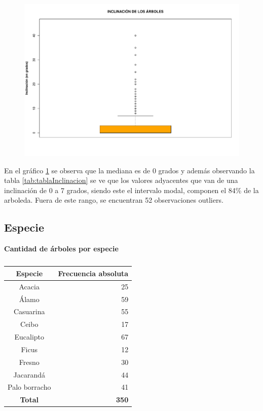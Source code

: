 \documentclass[11pt]{article}
\begin{document}
\begin{figure}[h!]
  \begin{center}
    \includegraphics[width=0.9\linewidth]{boxInclinacion.pdf}
    \caption{}
    \label{fig:boxInclinacion}
  \end{center}  
\end{figure}

\begin{justify}
  En el gráfico \ref{fig:boxInclinacion} se observa que la mediana
  es de 0 grados y además observando la tabla \ref{tab:tablaInclinacion}
  se ve que los valores adyacentes que van de una inclinación de 0 a 7 grados,
  siendo este el intervalo modal, componen el 84\% de la arboleda.
  Fuera de este rango, se encuentran 52 observaciones outliers. 
\end{justify}


\subsection{Especie}

\begin{table}[h!]
  \begin{center}
    \caption*{\textbf{Cantidad de árboles por especie}}
    \begin{tabular}{| c | r |}
      \hline
      \textbf{Especie} & \textbf{Frecuencia absoluta} \\ \hline
      Acacia & 25 \\ \hline
      Álamo & 59 \\ \hline
      Casuarina & 55 \\ \hline
      Ceibo & 17 \\ \hline
      Eucalipto & 67 \\ \hline
      Ficus & 12 \\ \hline
      Fresno & 30 \\ \hline
      Jacarandá & 44 \\ \hline
      Palo borracho & 41 \\ \hline
      \textbf{Total} & \textbf{350} \\ \hline
    \end{tabular}
    \caption{}
    \label{tab:tablaEspecie}
  \end{center}
\end{table}
\end{document}
